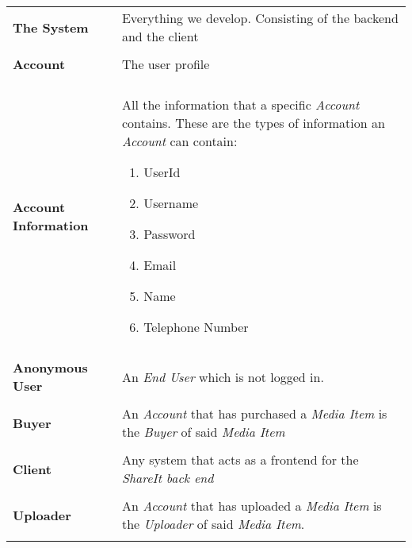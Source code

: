 \documentclass[../report.tex]{subfiles}
\begin{document}
\begin{tabular}{l p{10 cm}}
\textbf{The System} & Everything we develop. Consisting of the backend and the client \\ \\
\textbf{Account} & The user profile \\ \\
\textbf{Account Information} & All the information  that a specific \textit{Account} contains. These are the types of information an \textit{Account} can contain:
\begin{enumerate}
\item UserId
\item Username
\item Password
\item Email
\item Name
\item Telephone Number
\end{enumerate}\\ \\
\textbf{Anonymous User} & An \textit{End User} which is not logged in.\\ \\
\textbf{Buyer} & An \textit{Account} that has purchased a \textit{Media Item} is the \textit{Buyer} of said \textit{Media Item} \\ \\
\textbf{Client} & Any system that acts as a frontend for the \textit{ShareIt back end} \\ \\
\textbf{Uploader} & An \textit{Account} that has uploaded a \textit{Media Item} is the \textit{Uploader} of said \textit{Media Item}. \\ \\ %
\end{tabular}
\end{document}
